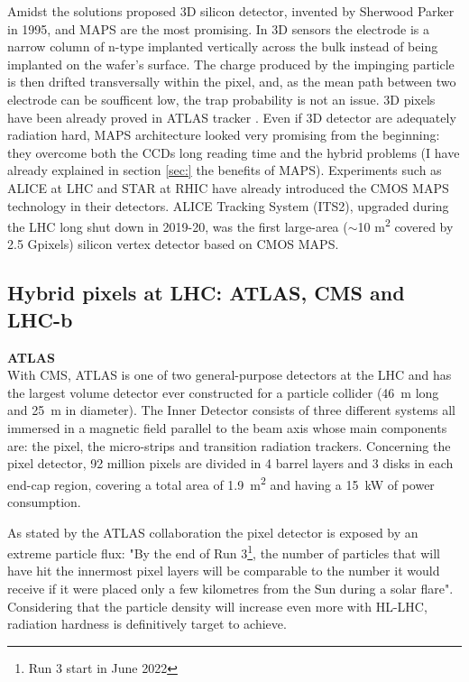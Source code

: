     Amidst the solutions proposed 3D silicon detector, invented by Sherwood Parker in 1995, and MAPS are the most promising. In 3D sensors the electrode is a narrow column of n-type implanted vertically across the bulk instead of being implanted on the wafer's surface. 
    The charge produced by the impinging particle is then drifted transversally within the pixel, and, as the mean path between two electrode can be soufficent low, the trap probability is not an issue. 
    3D pixels have been already proved in ATLAS tracker . 
    Even if 3D detector are adequately radiation hard, MAPS architecture looked very promising from the beginning: they overcome both the CCDs long reading time and the hybrid problems (I have already explained in section \ref{sec:} the benefits of MAPS). 
    Experiments such as ALICE at LHC and STAR at RHIC have already introduced the CMOS MAPS technology in their detectors. ALICE Tracking System (ITS2), upgraded during the LHC long shut down in 2019-20, was the first large-area ($\sim$10 \si{m\squared} covered by 2.5 Gpixels) silicon vertex detector based on CMOS MAPS.

    \subsection{Hybrid pixels at LHC: ATLAS, CMS and LHC-b}
        \textbf{ATLAS}\\
        With CMS, ATLAS is one of two general-purpose detectors at the LHC and has the largest volume detector ever constructed for a particle
        collider (\SI{46}{m} long and \SI{25}{m} in diameter).  
        The Inner Detector consists of three different systems all immersed in a magnetic field parallel to the beam axis whose main components are: the pixel, the micro-strips and transition radiation trackers. Concerning the pixel detector, 92 million pixels are divided in 4 barrel layers and 3 disks in each end-cap region, covering a total area of \SI{1.9}{m\squared} and having a \SI{15}{kW} of power consumption.

        As stated by the ATLAS collaboration the pixel detector is exposed by an extreme particle flux: "By the end of Run 3\footnote{Run 3 start in June 2022}, the number of particles that will have hit the innermost pixel layers will be comparable to the number it would receive if it were placed only a few kilometres from the Sun during a solar flare". Considering that the particle density will increase even more with HL-LHC, radiation hardness is definitively target to achieve. 

